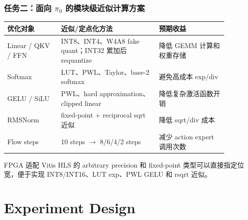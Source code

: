 \documentclass[10pt, aspectratio=169]{beamer}
\newcommand{\piZero}{\texorpdfstring{$\pi_0$}{pi0}\xspace}
\begin{document}
\begin{frame}
  \frametitle{任务二：面向 \piZero 的模块级近似计算方案}
  \small
  \begin{table}
    \scriptsize
    \setlength{\tabcolsep}{3pt}
    \begin{tabular}{@{}p{0.22\linewidth}p{0.40\linewidth}p{0.28\linewidth}@{}}
      \toprule
      优化对象               & 近似/定点化方法                                             & 预期收益                  \\
      \midrule
      Linear / QKV / FFN & INT8、INT4、W4A8 fake quant；INT32 累加后 requantize & 降低 GEMM 计算和权重存储       \\
      Softmax            & LUT、PWL、Taylor、base-2 softmax                        & 避免高成本 exp/div         \\
      GELU / SiLU        & PWL、hard approximation、clipped linear                & 降低复杂激活函数开销            \\
      RMSNorm            & fixed-point + reciprocal sqrt 近似                     & 降低 sqrt/div 成本        \\
      Flow steps         & 10 steps $\rightarrow$ 8/6/4/2 steps                 & 减少 action expert 调用次数 \\
      \bottomrule
    \end{tabular}
  \end{table}

  \vspace{4pt}
  \begin{exampleblock}{FPGA 适配}
    Vitis HLS 的 arbitrary precision 和 fixed-point 类型可以直接指定位宽，便于实现 INT8/INT16、LUT exp、PWL GELU 和 rsqrt 近似。
  \end{exampleblock}
\end{frame}

\section{Experiment Design}
\end{document}
